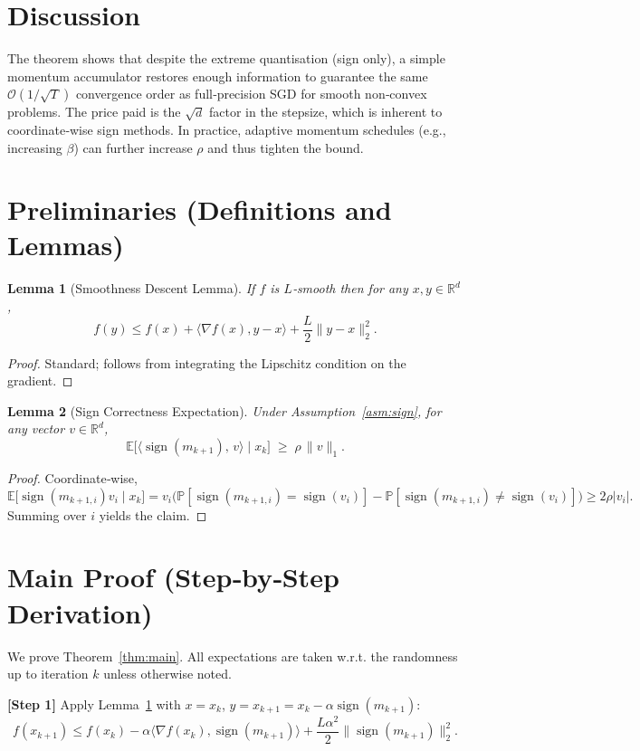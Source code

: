 \documentclass{article}
\newtheorem{lemma}{Lemma}
\begin{document}
\section*{Discussion}
The theorem shows that despite the extreme quantisation (sign only), a simple momentum accumulator restores enough information to guarantee the same $\mathcal{O}(1/\sqrt{T})$ convergence order as full‑precision SGD for smooth non‑convex problems. The price paid is the $\sqrt{d}$ factor in the stepsize, which is inherent to coordinate‑wise sign methods. In practice, adaptive momentum schedules (e.g., increasing $\beta$) can further increase $\rho$ and thus tighten the bound.

\newpage
\section*{Preliminaries (Definitions and Lemmas)}
\begin{lemma}[Smoothness Descent Lemma]\label{lem:smooth}
If $f$ is $L$‑smooth then for any $x,y\in\mathbb{R}^d$,
\[
f(y)\le f(x)+\langle\nabla f(x),y-x\rangle+\frac{L}{2}\|y-x\|_2^2 .
\]
\end{lemma}
\begin{proof}
Standard; follows from integrating the Lipschitz condition on the gradient. \end{proof}

\begin{lemma}[Sign Correctness Expectation]\label{lem:sign}
Under Assumption~\ref{asm:sign}, for any vector $v\in\mathbb{R}^d$,
\[
\mathbb{E}\big[\langle \operatorname{sign}(m_{k+1}),\,v\rangle\mid x_k\big]
\;\ge\;
\rho\,\|v\|_1 .
\]
\end{lemma}
\begin{proof}
Coordinate‑wise,
\[
\mathbb{E}\big[\operatorname{sign}(m_{k+1,i})v_i\mid x_k\big]
= v_i\big(\mathbb{P}[\operatorname{sign}(m_{k+1,i})=\operatorname{sign}(v_i)]- \mathbb{P}[\operatorname{sign}(m_{k+1,i})\neq\operatorname{sign}(v_i)]\big)
\ge 2\rho|v_i| .
\]
Summing over $i$ yields the claim. \end{proof}

\section*{Main Proof (Step‑by‑Step Derivation)}
We prove Theorem~\ref{thm:main}. All expectations are taken w.r.t. the randomness up to iteration $k$ unless otherwise noted.

\bigskip
\noindent\textbf{[Step 1]} Apply Lemma~\ref{lem:smooth} with $x=x_k$, $y=x_{k+1}=x_k-\alpha\operatorname{sign}(m_{k+1})$:
\[
f(x_{k+1})\le f(x_k)-\alpha\langle\nabla f(x_k),\operatorname{sign}(m_{k+1})\rangle+\frac{L\alpha^2}{2}\|\operatorname{sign}(m_{k+1})\|_2^2 .
\tag{1}
\]
\end{document}
